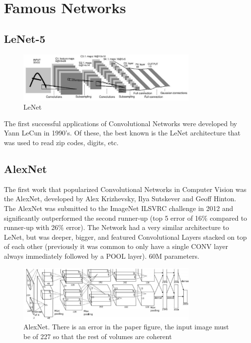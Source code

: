 \chapter{Famous Networks}
\section*{LeNet-5}
\begin{figure}[h]
  \centering
  \includegraphics[width=0.8\textwidth]{Images/famous_networks/1.png}
  \caption{LeNet}
\end{figure}
The first successful applications of Convolutional Networks were developed by Yann LeCun in 1990’s. Of these, the best known is the LeNet architecture that was used to read zip codes, digits, etc.

\section*{AlexNet}
The first work that popularized Convolutional Networks in Computer Vision was the AlexNet, developed by Alex Krizhevsky, Ilya Sutskever and Geoff Hinton. The AlexNet was submitted to the ImageNet ILSVRC challenge in 2012 and significantly outperformed the second runner-up (top 5 error of 16\% compared to runner-up with 26\% error). The Network had a very similar architecture to LeNet, but was deeper, bigger, and featured Convolutional Layers stacked on top of each other (previously it was common to only have a single CONV layer always immediately followed by a POOL layer). 60M parameters.

\begin{figure}[h]
  \centering
  \includegraphics[width=0.8\textwidth]{Images/famous_networks/2.png}
  \caption{AlexNet. There is an error in the paper figure, the input image must be of 227 so that the rest of volumes are coherent}
\end{figure}

